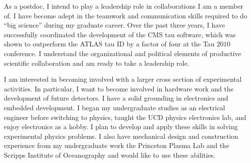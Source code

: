 \documentclass{scrartcl}        %
\begin{document}
\begin{cv}{}
As a postdoc, I intend to play a leadership role in collaborations I am a member
of.  I have become adept in the teamwork and communication skills required to do
``big science'' during my graduate career.  Over the past three years, I have
successfully coordinated the development of the CMS tau software, which was shown to
outperform the ATLAS tau ID by a factor of four at the Tau $2010$ conference.  I
understand the organizational and political elements of productive scientific
collaboration and am ready to take a leadership role.

I am interested in becoming involved with a larger cross section of experimental
activities.  In particular, I want to become involved in hardware work and the
development of future detectors. I have a solid grounding in electronics and
embedded development. I began my undergraduate studies as an electrical engineer
before switching to physics, taught the UCD physics electronics lab, and enjoy
electronics as a hobby.  I plan to develop and apply these skills in solving
experimental physics problems.  I also have mechanical design and construction
experience from my undergraduate work the Princeton Plasma Lab and the Scripps
Institute of Oceanography and would like to use these abilities.





\end{cv}
\end{document}
